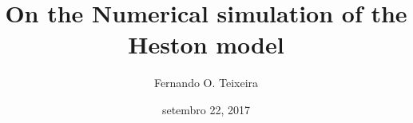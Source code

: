\documentclass[12pt,twoside]{reedthesis}
\title{\textbf{\Huge{On the Numerical simulation of the \\[20pt] Heston model}}}
\author{Fernando O. Teixeira}
\date{setembro 22, 2017}
\theoremstyle{definition}
\theoremstyle{definition}
\theoremstyle{remark}
\begin{document}
      \maketitle
  
  \frontmatter %
  \pagestyle{empty} %
      \begin{acknowledgements}
      \textbf{\\ \\ \\ \\ \\ \\ \\ \\ \\ \\ \\ \\ \\ \\ \\ \\ \\ \\ \\ \\ \\ \\ \\ \\ \\ \\ \\ \\ \\ \\ \\ \\ \\ \\ \\ \\ \\ \\ \\ \\ \\ \\ \\ \\ \\ \\ \\ \\ \\ \\ \\ \\ \\ \\ \\ \\ \\ \\ \\ \\ \\ \\ \\ }

\end{acknowledgements}
\end{document}
